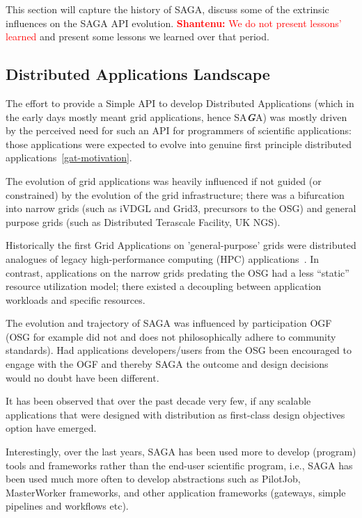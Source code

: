 \documentclass[]{article}
\newcommand{\B}[1]{\textbf{#1}}
\newcommand{\BI}[1]{\textbf{\textit{#1}}}
\newcommand{\smilie}{\small;-)~\xspace}
\newcommand{\jhanote}[1]{{\textcolor{red}{     \B{Shantenu:} #1 }}}
\newcommand{\jhanote}[1]{}
\begin{document}
This section will capture the history of SAGA, discuss some of the
extrinsic influences on the SAGA API evolution.  \jhanote{We do not
  present lessons' learned} and present some lessons we learned over
that period.  


\subsection{Distributed Applications Landscape}

The effort to provide a Simple API to develop Distributed Applications
(which in the early days mostly meant grid applications, hence
SA\BI{G}A) was mostly driven by the perceived need for such an API for
programmers of scientific applications: those applications were
expected to evolve into genuine first principle distributed
applications~\ref{gat-motivation}.

The evolution of grid applications was heavily influenced if not
guided (or constrained) by the evolution of the grid infrastructure;
there was a bifurcation into narrow grids (such as iVDGL and Grid3,
precursors to the OSG) and general purpose grids (such as Distributed
Terascale Facility, UK NGS).

Historically the first Grid Applications on 'general-purpose' grids
were distributed analogues of legacy high-performance computing (HPC)
applications~\cite{dpagrid2009}. In contrast, applications on the
narrow grids predating the OSG had a less ``static'' resource
utilization model; there existed a decoupling between application
workloads and specific resources.

The evolution and trajectory of SAGA was influenced by participation
OGF (OSG for example did not and does not philosophically
adhere to community standards). Had applications developers/users from
the OSG been encouraged to engage with the OGF and thereby SAGA the
outcome and design decisions would no doubt have been different.

It has been observed that over the past decade very few, if any
scalable applications that were designed with distribution as
first-class design objectives option have emerged.

Interestingly, over the last years, SAGA has been used more to develop
(program) tools and frameworks rather than the end-user scientific
program, i.e., SAGA has been used much more often to develop
abstractions such as PilotJob, MasterWorker frameworks, and other
application frameworks (gateways, simple pipelines and workflows etc).
\end{document}
